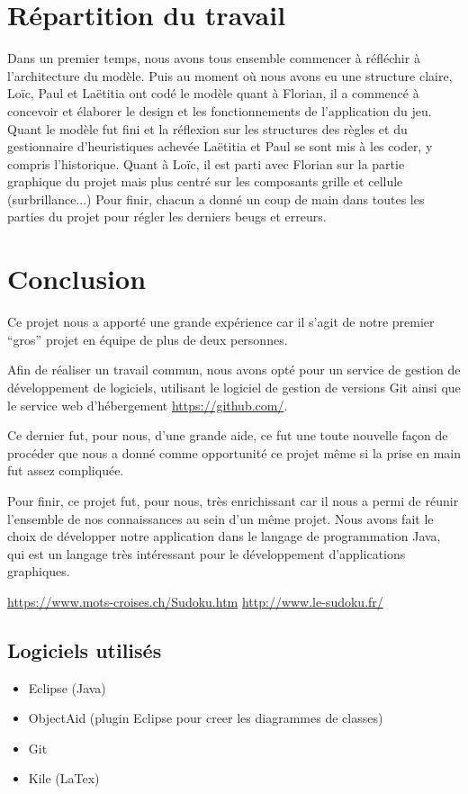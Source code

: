 \section{Répartition du travail}
Dans un premier temps, nous avons tous ensemble commencer à réfléchir à l'architecture du modèle.
Puis au moment où nous avons eu une structure claire, Loïc, Paul et Laëtitia ont codé le modèle quant
à Florian, il a commencé à concevoir et élaborer le design et les fonctionnements de l'application du jeu.
Quant le modèle fut fini et la réflexion sur les structures des règles et du gestionnaire d'heuristiques
achevée Laëtitia et Paul se sont mis à les coder, y compris l'historique. Quant à Loïc, il est parti avec 
Florian sur la partie graphique du projet mais plus centré sur les composants grille et cellule (surbrillance...)
Pour finir, chacun a donné un coup de main dans toutes les parties du projet pour régler les derniers beugs et erreurs.

\newpage
\section{Conclusion}
Ce projet nous a apporté une grande expérience car il s'agit 
de notre premier ``gros'' projet en équipe de plus de deux personnes.

Afin de réaliser un travail commun, nous avons opté pour un service 
de gestion de développement de logiciels, utilisant le logiciel 
de gestion de versions Git ainsi que le service web d'hébergement \url{https://github.com/}.

Ce dernier fut, pour nous, d'une grande aide, ce fut une toute nouvelle façon de 
procéder que nous a donné comme opportunité ce projet même si la prise en main 
fut assez compliquée.

Pour finir, ce projet fut, pour nous, très enrichissant car il nous a permi de réunir
l'ensemble de nos connaissances au sein d'un même projet. Nous avons fait le choix 
de développer notre application dans le langage de programmation Java, qui est un langage
très intéressant pour le développement d'applications graphiques.

\begin{thebibliography}{9}
          \url{https://www.mots-croises.ch/Sudoku.htm}
          \url{http://www.le-sudoku.fr/}
\end{thebibliography}

\subsection*{Logiciels utilisés}
\begin{itemize}
\item Eclipse (Java)
\item ObjectAid (plugin Eclipse pour creer les diagrammes de classes)
\item Git
\item Kile (LaTex)
\end{itemize}

